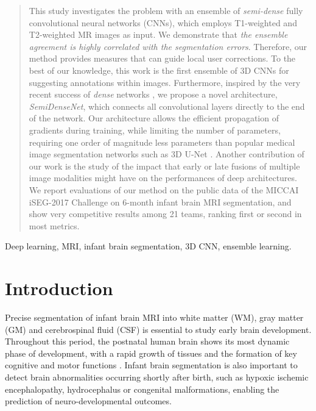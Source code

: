 \documentclass[twoside,espcrc2]{elsarticle}
\begin{document}
\begin{frontmatter}
\begin{abstract}
This study investigates the problem with an ensemble of {\em semi-dense} fully convolutional neural networks (CNNs), which employs T1-weighted and T2-weighted MR images as input. We demonstrate that {\em the ensemble agreement is highly correlated with the segmentation errors}. Therefore, our method provides measures that can guide local user corrections. To the best of our knowledge, this work is the first ensemble of 3D CNNs for suggesting annotations within images. Furthermore, inspired by the very recent success of {\em dense} networks \cite{huang2016densely}, we propose a novel architecture, \emph{SemiDenseNet}, which connects all convolutional layers directly to the end of the network. Our architecture allows the efficient propagation of gradients during training, while limiting the number of parameters, requiring one order of magnitude less parameters than popular medical image segmentation networks such as 3D U-Net \cite{cciccek20163d}. Another contribution of our work is the study of the impact that early or late fusions of multiple image modalities might have on the performances of deep architectures. We report evaluations of our method on the public data of the MICCAI iSEG-2017 Challenge on 6-month infant brain MRI segmentation, and show very competitive results among 21 teams, ranking first or second in most metrics.
 
\end{abstract}

\begin{keyword}
Deep learning, MRI, infant brain segmentation, 3D CNN, ensemble learning.
\end{keyword}

\end{frontmatter}





\section{Introduction}

Precise segmentation of infant brain MRI into white matter (WM), gray matter (GM) and cerebrospinal fluid (CSF) is essential to study early brain development. Throughout this period, the postnatal human brain shows its most dynamic phase of development, with a rapid growth of tissues and the formation of key cognitive and motor functions \cite{paus2001maturation}. Infant brain segmentation is also important to detect brain abnormalities occurring shortly after birth, such as hypoxic ischemic encephalopathy, hydrocephalus or congenital malformations, enabling the prediction of neuro-developmental outcomes. 
\end{document}
